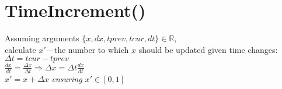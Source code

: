 \documentclass[12pt]{article}
\begin{document}

	\section*{TimeIncrement()}
	
	Assuming arguments $\{x, dx, tprev, tcur, dt\}\in\mathbb{R}$,\\
	calculate $x'$—the number to which $x$ should be updated given time changes:\\
	
	$\Delta t = tcur - tprev$\\
	
	$\frac{dx}{dt} = \frac{\Delta x}{\Delta t}\Rightarrow\Delta x = \Delta t\frac{dx}{dt}$\\
	
	$x' = x + \Delta x$ \textit{ensuring $x'\in [0,1]$}\\
	
\end{document}

